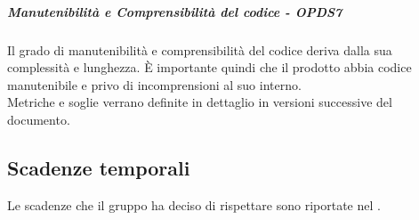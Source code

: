 \documentclass[PianoDiQualifica.tex]{subfiles}
\begin{document}
				\subparagraph{Manutenibilità e Comprensibilità del codice - OPDS7}
				Il grado di manutenibilità e comprensibilità del codice deriva dalla sua complessità e lunghezza. È importante quindi che il prodotto abbia codice manutenibile e
				privo di incomprensioni al suo interno. \\
				Metriche e soglie verrano definite in dettaglio in versioni successive del documento.

		\subsection{Scadenze temporali}
		Le scadenze che il gruppo \GRUPPO{} ha deciso di rispettare sono riportate nel \PPdocRR{}.
\end{document}
